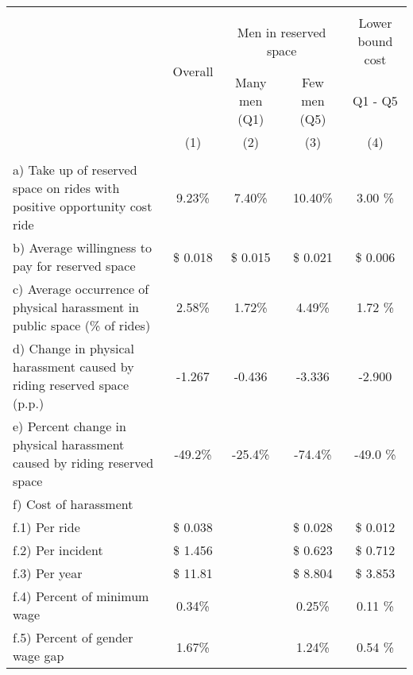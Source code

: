 \begin{tabular}{lcccc}
       \hline\hline  \\[-1.8ex] 
       & \multirow{2}{*}{Overall} & \multicolumn{2}{c}{Men in reserved space} & Lower bound cost \\
       &  & Many men (Q1) & Few men (Q5)  & Q1 - Q5 \\
       & (1) & (2) & (3) & (4)  \\
       \hline   \\[-1.8ex]
       a) Take up of reserved space on rides with positive opportunity cost ride  &         9.23\% &        7.40\% &       10.40\% &        3.00 \%  \\
       b) Average willingness to pay for reserved space                                                   & \$   0.018   & \$   0.015   & \$   0.021   & \$   0.006     \\
       c) Average occurrence of physical harassment in public space (\% of rides) &        2.58\% &        1.72\% &        4.49\% &        1.72 \%  \\
       d) Change in physical harassment caused by riding reserved space (p.p.)    &      -1.267   &      -0.436   &      -3.336   &      -2.900     \\
       e) Percent change in physical harassment caused by riding reserved space   &       -49.2\% &       -25.4\% &       -74.4\% &       -49.0 \%  \\
       \multicolumn{5}{l}{f) Cost of harassment} \\
       f.1) Per ride                                                                                                                      & \$   0.038   &       & \$   0.028   & \$   0.012     \\
       f.2) Per incident                                                                                                                  & \$   1.456   &       & \$   0.623   & \$   0.712     \\
       f.3) Per year                                                                                                                      & \$   11.81   &       & \$   8.804   & \$   3.853     \\
       f.4) Percent of minimum wage                                                                                       &        0.34\% &       &              0.25\% &        0.11 \%  \\
       f.5) Percent of gender wage gap                                                                                    &        1.67\% &       &              1.24\% &        0.54 \%  \\
       \hline \hline
\end{tabular}